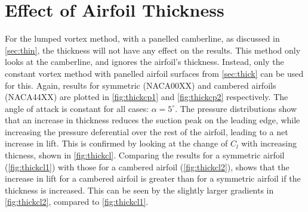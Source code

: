 \section{Effect of Airfoil Thickness}
\label{sec:thickness}

For the lumped vortex method, with a panelled camberline, as discussed in
\autoref{sec:thin}, the thickness will not have any effect on the results. This
method only looks at the camberline, and ignores the airfoil's thickness.
Instead, only the constant vortex method with panelled airfoil surfaces from
\autoref{sec:thick} can be used for this. Again, results for symmetric
(NACA00XX) and cambered airfoils (NACA44XX) are plotted in
\autoref{fig:thickcp1} and \autoref{fig:thickcp2} respectively. The angle of
attack is constant for all cases: $\alpha = 5^{\circ}$. The pressure
distributions show that an increase in thickness reduces the suction peak on the
leading edge, while increasing the pressure deferential over the rest of the
airfoil, leading to a net increase in lift. This is confirmed by looking at the
change of $C_l$ with increasing thicness, shown in \autoref{fig:thickcl}.
Comparing the results for a symmetric airfoil (\autoref{fig:thickcl1}) with
those for a cambered airfoil (\autoref{fig:thickcl2}), shows that the increase
in lift for a cambered airfoil is greater than for a symmetric airfoil if the
thickness is increased. This can be seen by the slightly larger gradients in
\autoref{fig:thickcl2}, compared to \autoref{fig:thickcl1}.

